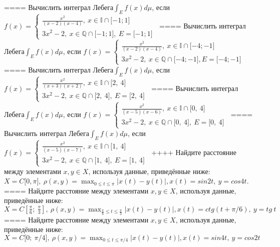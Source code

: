 ====
Вычислить интеграл Лебега\(\int_{E}^{}f(x)d\mu\), если \(f(x) = \left\{ \begin{matrix}
\frac{x^{2}}{(x - 2)(x - 4)},\ x \in \mathbb{I} \cap \lbrack - 1;1\rbrack \\
3x^{2} - 2,\ x\mathbb{\in Q \cap}\lbrack - 1;1\rbrack,\ E = \lbrack - 1;1\rbrack
\end{matrix} \right.\ \)
====
Вычислить интеграл Лебега\(\int_{E}^{}f(x)d\mu\), если \(f(x) = \left\{ \begin{matrix}
\frac{x^{2}}{(x - 2)(x - 4)},\ x \in \mathbb{I} \cap \lbrack - 4; - 1\rbrack \\
3x^{2} - 2,\ x\mathbb{\in Q \cap}\lbrack - 4; - 1\rbrack,E = \lbrack - 4; - 1\rbrack
\end{matrix} \right.\ \)
====
Вычислить интеграл Лебега\(\int_{E}^{}f(x)d\mu\), если \(f(x) = \left\{ \begin{matrix}
\frac{x^{2}}{(x + 3)(x + 2)},\ x \in \mathbb{I} \cap \lbrack 2,\ 4\rbrack \\
3x^{2} - 2,\ x\mathbb{\in Q \cap}\lbrack 2,\ 4\rbrack,\ E = \lbrack 2,\ 4\rbrack
\end{matrix} \right.\ \)
====
Вычислить интеграл Лебега\(\int_{E}^{}f(x)d\mu\), если \(f(x) = \left\{ \begin{matrix}
\frac{x^{2}}{(x - 5)(x - 6)},\ x \in \mathbb{I} \cap \lbrack 0,\ 4\rbrack \\
3x^{2} - 2,\ x\mathbb{\in Q \cap}\lbrack 0,\ 4\rbrack,\ E = \lbrack 0,\ 4\rbrack
\end{matrix} \right.\ \)
====
Вычислить интеграл Лебега\(\int_{E}^{}f(x)d\mu\), если \(f(x) = \left\{ \begin{matrix}
\frac{x^{2}}{(x - 5)(x - 7)},\ x \in \mathbb{I} \cap \lbrack 1,\ 4\rbrack \\
3x^{2} - 2,\ x\mathbb{\in Q \cap}\lbrack 1,\ 4\rbrack,\ E = \lbrack 1,\ 4\rbrack
\end{matrix} \right.\ \)
++++
Найдите расстояние между элементами \(x,y \in X\), используя данные, приведённые ниже: \(X = C\lbrack 0,\pi\rbrack,\ \rho(x,y) = \max_{0 \leq t \leq \pi}|x(t) - y(t)|,x(t) = sin2t,\ y = cos4t\).
====
Найдите расстояние между элементами \(x,y \in X\), используя данные, приведённые ниже: \(X = C\left\lbrack \frac{\pi}{6};\ \frac{\pi}{3} \right\rbrack,\ \rho(x,y) = \max_{\frac{\pi}{6} \leq t \leq \frac{\pi}{3}}|x(t) - y(t)|,x(t) = ctg(t + \pi/6),\ y = tg\ t\)
====
Найдите расстояние между элементами \(x,y \in X\), используя данные, приведённые ниже: \(X = C\lbrack 0;\ \pi/4\rbrack,\ \rho(x,y) = \max_{0 \leq t \leq \pi/4}|x(t) - y(t)|,x(t) = sin4t,\ y = cos2t\)
